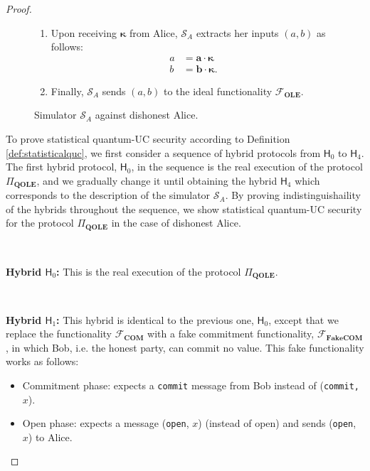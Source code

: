 \begin{proof}
\begin{figure}[h!]
\begin{tcolorbox}
\begin{enumerate}
 
        
        \item Upon receiving $\bm{\kappa}$ from Alice, $\mathcal{S}_A$ extracts her inputs $(a,b)$ as follows:
        \begin{equation}
            \begin{split}
            a &= \bm{a} \cdot \bm{\kappa} \\
            b &= \bm{b} \cdot \bm{\kappa}.
            \end{split}
        \label{eqn:extract_2}
        \end{equation}
        
        
        \item Finally, $\mathcal{S}_A$ sends $(a,b)$ to the ideal functionality $\mathcal{F}_{\textbf{OLE}}$.
        
    \end{enumerate} 
        
        \end{tcolorbox}
\caption{Simulator $\mathcal{S}_A$ against  dishonest Alice.}
\label{fig:simulator_dis_Alice}
\end{figure}
To prove statistical quantum-UC security according to Definition \ref{def:statisticalquc}, we first consider a sequence of hybrid protocols from $\mathsf{H}_0$ to $\mathsf{H}_4$. The first hybrid protocol, $\mathsf{H}_0$, in the sequence  is the real execution of the protocol $\Pi_{\textbf{QOLE}}$, and we gradually change it until obtaining the hybrid $\mathsf{H}_4$ which corresponds to the description of the simulator $\mathcal{S}_A$. By proving indistinguishaility of the hybrids throughout the sequence, we show statistical quantum-UC security for the protocol $\Pi_{\textbf{QOLE}}$ in the case of dishonest Alice.


\

\textbf{Hybrid $\mathsf{H}_0$:} This is the real execution of the protocol $\Pi_{\textbf{QOLE}}$.

\

\textbf{Hybrid $\mathsf{H}_1$:} This hybrid is identical to the previous one, $\mathsf{H}_0$, except that we replace the functionality $\mathcal{F}_{\textbf{COM}}$ with a fake commitment functionality, $\mathcal{F}_{\textbf{FakeCOM}}$, in which Bob, i.e. the honest party, can commit no value. This fake functionality works as follows: 

\begin{itemize}
    \item Commitment phase: expects a \texttt{commit} message from Bob instead of (\texttt{commit, $x$}).
    \item Open phase: expects a message (\texttt{open}, $x$) (instead of open) and sends (\texttt{open}, $x$) to Alice.
\end{itemize}


\end{proof}
